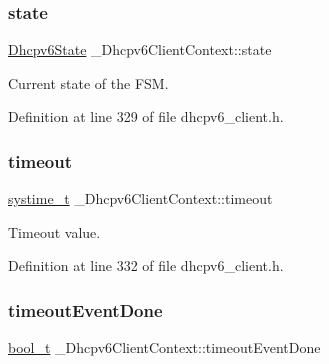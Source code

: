 \mbox{\label{struct__Dhcpv6ClientContext_a0165e7c93462103ace66d9b4a0ba10cf}} 
\subsubsection{\texorpdfstring{state}{state}}
{\footnotesize\ttfamily \hyperlink{dhcpv6__client_8h_a8610bfd009af9756638a193136ef93f9}{Dhcpv6\+State} \+\_\+\+Dhcpv6\+Client\+Context\+::state}



Current state of the F\+SM. 



Definition at line 329 of file dhcpv6\+\_\+client.\+h.

\mbox{\label{struct__Dhcpv6ClientContext_ab56d35b1f2566414ae523d4714996b64}} 
\subsubsection{\texorpdfstring{timeout}{timeout}}
{\footnotesize\ttfamily \hyperlink{compiler__port_8h_ae3e32a98d431a02106616da3071832dd}{systime\+\_\+t} \+\_\+\+Dhcpv6\+Client\+Context\+::timeout}



Timeout value. 



Definition at line 332 of file dhcpv6\+\_\+client.\+h.

\mbox{\label{struct__Dhcpv6ClientContext_a9201218dcff78572d9a55cf3d980444c}} 
\subsubsection{\texorpdfstring{timeout\+Event\+Done}{timeoutEventDone}}
{\footnotesize\ttfamily \hyperlink{compiler__port_8h_a812d16e5494522586b3784e55d479912}{bool\+\_\+t} \+\_\+\+Dhcpv6\+Client\+Context\+::timeout\+Event\+Done}



